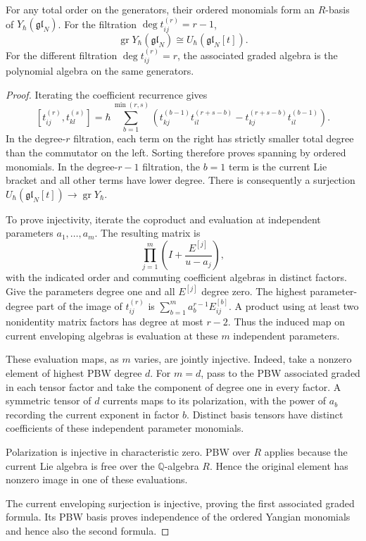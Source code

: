 \begin{theorem}
\label{thm:alg-rtt-pbw}
For any total order on the generators, their ordered monomials form an $R$-basis of $Y_\hbar(\mathfrak{gl}_N)$.
For the filtration $\deg t_{ij}^{(r)}=r-1$,
\[
 \operatorname{gr}Y_\hbar(\mathfrak{gl}_N)
 \cong U_\hbar(\mathfrak{gl}_N[t]).
\]
For the different filtration $\deg t_{ij}^{(r)}=r$, the associated graded algebra is the polynomial algebra on the same generators.
\end{theorem}
\begin{proof}
Iterating the coefficient recurrence gives
\[
 [t_{ij}^{(r)},t_{kl}^{(s)}]
 =\hbar\sum_{b=1}^{\min(r,s)}
 \left(t_{kj}^{(b-1)}t_{il}^{(r+s-b)}
       -t_{kj}^{(r+s-b)}t_{il}^{(b-1)}\right).
\]
In the degree-$r$ filtration, each term on the right has strictly smaller total degree than the commutator on the left.
Sorting therefore proves spanning by ordered monomials.
In the degree-$r-1$ filtration, the $b=1$ term is the current Lie bracket and all other terms have lower degree.
There is consequently a surjection
$U_\hbar(\mathfrak{gl}_N[t])\to\operatorname{gr}Y_\hbar$.

To prove injectivity, iterate the coproduct and evaluation at independent parameters $a_1,\ldots,a_m$.
The resulting matrix is
\[
 \prod_{j=1}^m\left(I+\frac{E^{[j]}}{u-a_j}\right),
\]
with the indicated order and commuting coefficient algebras in distinct factors.
Give the parameters degree one and all $E^{[j]}$ degree zero.
The highest parameter-degree part of the image of $t_{ij}^{(r)}$ is
$\sum_{b=1}^m a_b^{r-1}E_{ij}^{[b]}$. A product using at least two nonidentity matrix factors has degree at most $r-2$.
Thus the induced map on current enveloping algebras is evaluation at these $m$ independent parameters.

These evaluation maps, as $m$ varies, are jointly injective.
Indeed, take a nonzero element of highest PBW degree $d$.
For $m=d$, pass to the PBW associated graded in each tensor factor and take the component of degree one in every factor.
A symmetric tensor of $d$ currents maps to its polarization, with the power of $a_b$ recording the current exponent in factor $b$.
Distinct basis tensors have distinct coefficients of these independent parameter monomials.

Polarization is injective in characteristic zero.
PBW over $R$ applies because the current Lie algebra is free over the $\mathbb Q$-algebra $R$.
Hence the original element has nonzero image in one of these evaluations.

The current enveloping surjection is injective, proving the first associated graded formula.
Its PBW basis proves independence of the ordered Yangian monomials and hence also the second formula.
\end{proof}

